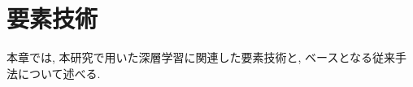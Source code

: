 \chapter{要素技術}
\label{chap:technology}
%
本章では, 本研究で用いた深層学習に関連した要素技術と, ベースとなる従来手法について述べる.
%
%





%
